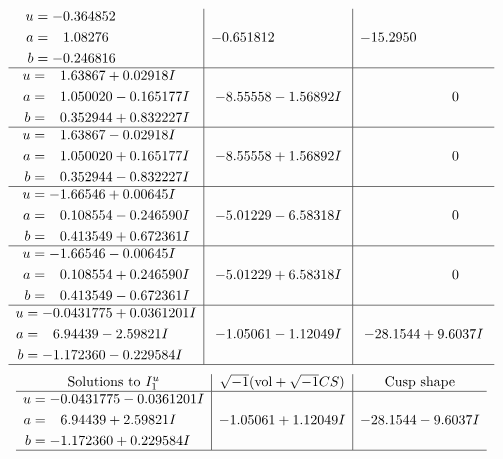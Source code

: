 \documentclass[1p]{elsarticle_modified}
\theoremstyle{definition}
\newcommand{\I}{\sqrt{-1}}
\begin{document}
$$\begin{array}{c|c|c}
\begin{aligned}
u &= -0.364852\phantom{ +0.000000I} \\
a &= \phantom{-}1.08276\phantom{ +0.000000I} \\
b &= -0.246816\phantom{ +0.000000I}\end{aligned}
 & -0.651812\phantom{ +0.000000I} & -15.2950\phantom{ +0.000000I} \\ \hline\begin{aligned}
u &= \phantom{-}1.63867 + 0.02918 I \\
a &= \phantom{-}1.050020 - 0.165177 I \\
b &= \phantom{-}0.352944 + 0.832227 I\end{aligned}
 & -8.55558 - 1.56892 I & \phantom{-0.000000 } 0 \\ \hline\begin{aligned}
u &= \phantom{-}1.63867 - 0.02918 I \\
a &= \phantom{-}1.050020 + 0.165177 I \\
b &= \phantom{-}0.352944 - 0.832227 I\end{aligned}
 & -8.55558 + 1.56892 I & \phantom{-0.000000 } 0 \\ \hline\begin{aligned}
u &= -1.66546 + 0.00645 I \\
a &= \phantom{-}0.108554 - 0.246590 I \\
b &= \phantom{-}0.413549 + 0.672361 I\end{aligned}
 & -5.01229 - 6.58318 I & \phantom{-0.000000 } 0 \\ \hline\begin{aligned}
u &= -1.66546 - 0.00645 I \\
a &= \phantom{-}0.108554 + 0.246590 I \\
b &= \phantom{-}0.413549 - 0.672361 I\end{aligned}
 & -5.01229 + 6.58318 I & \phantom{-0.000000 } 0 \\ \hline\begin{aligned}
u &= -0.0431775 + 0.0361201 I \\
a &= \phantom{-}6.94439 - 2.59821 I \\
b &= -1.172360 - 0.229584 I\end{aligned}
 & -1.05061 - 1.12049 I & -28.1544 + 9.6037 I\\
 \hline 
 \end{array}$$\newpage$$\begin{array}{c|c|c}  
\text{Solutions to }I^u_{1}& \I (\text{vol} + \sqrt{-1}CS) & \text{Cusp shape}\\
 \hline 
\begin{aligned}
u &= -0.0431775 - 0.0361201 I \\
a &= \phantom{-}6.94439 + 2.59821 I \\
b &= -1.172360 + 0.229584 I\end{aligned}
 & -1.05061 + 1.12049 I & -28.1544 - 9.6037 I\\
 \hline 
 \end{array}$$\newpage\newpage\renewcommand{\arraystretch}{1}
\end{document}
